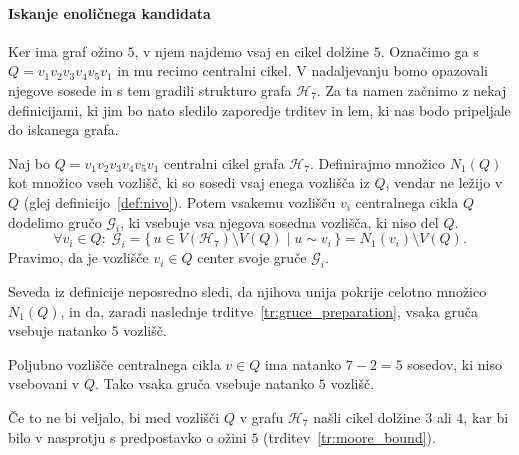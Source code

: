 \documentclass[fin1, tisk]{fmfdelo}
\newcommand{\gr}{\mathscr{G}}
\newcommand{\hof}{\mathscr{H}_{7}}
\begin{document}
\paragraph{Iskanje enoličnega kandidata}

Ker ima graf ožino $5$, v njem najdemo vsaj en cikel dolžine $5$. Označimo ga s
$Q=v_1 v_2 v_3 v_4 v_5 v_1$ in mu recimo centralni cikel. 
V nadaljevanju bomo opazovali njegove sosede
in s tem gradili strukturo grafa $\hof$. Za ta namen začnimo z nekaj definicijami, ki jim
bo nato sledilo zaporedje trditev in lem, ki nas bodo pripeljale do iskanega grafa.

\begin{definicija}\label{def:gruce}
    Naj bo $Q = v_1 v_2 v_3 v_4 v_5 v_1$ centralni cikel grafa $\hof$. 
    Definirajmo množico $N_1(Q)$ kot množico vseh vozlišč, 
    ki so sosedi vsaj enega vozlišča iz $Q$, vendar ne ležijo v $Q$ (glej definicijo~\ref{def:nivo}).
    Potem vsakemu vozlišču $v_i$ centralnega cikla $Q$ dodelimo gručo $\gr_i$, ki vsebuje vsa
    njegova sosedna vozlišča, ki niso del $Q$.
    \begin{equation}\label{eq:gruce_definicija}
        \forall v_i \in Q: \; \gr_i = \{\, u \in V(\hof) \setminus V(Q) \mid u \sim v_i\,\} = N_1(v_i) \setminus V(Q).
    \end{equation}
    Pravimo, da je vozlišče $v_i\in Q$ center svoje gruče $\gr_i$.
\end{definicija}

\begin{opomba}
    Seveda iz definicije neposredno sledi, da njihova unija pokrije ce\-lot\-no množico $N_1(Q)$,
    in da, zaradi naslednje trditve~\ref{tr:gruce_preparation}, vsaka gruča vsebuje natanko $5$ vozlišč.
\end{opomba}

\begin{trditev}\label{tr:gruce_preparation}
    Poljubno vozlišče centralnega cikla $v \in Q$ ima natanko $7 - 2 = 5$ sosedov, ki niso vsebovani v $Q$.
    Tako vsaka gruča vsebuje natanko $5$ vozlišč.
\end{trditev}
\begin{dokaz}
    Če to ne bi veljalo, bi med vozlišči $Q$ v grafu $\hof$ našli cikel dolžine $3$ ali $4$, kar bi 
    bilo v nasprotju s predpostavko o ožini $5$ (trditev~\ref{tr:moore_bound}).
\end{dokaz}


\end{document}
